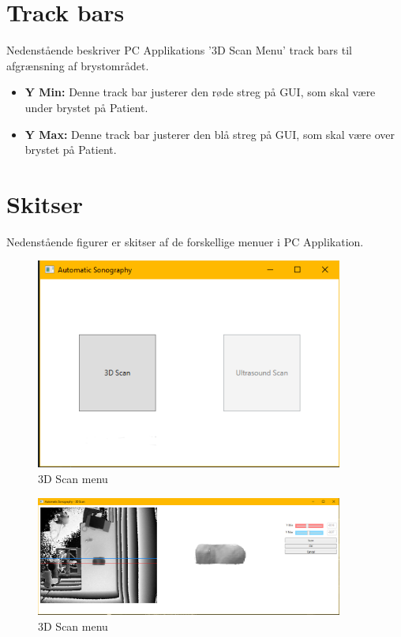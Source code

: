 \section{Track bars}
Nedenstående beskriver PC Applikations '3D Scan Menu' track bars til afgrænsning af brystområdet.  
\begin{itemize}
\item \textbf{Y Min:} Denne track bar justerer den røde streg på GUI, som skal være under brystet på Patient. 
\item \textbf{Y Max:} Denne track bar justerer den blå streg på GUI, som skal være over brystet på Patient. 
\end{itemize}

\section{Skitser}
Nedenstående figurer er skitser af de forskellige menuer i PC Applikation. 

\begin{figure} [h]
    \centering
    \includegraphics[width=0.9\textwidth]{figurer/d/GUIskitse/main_menu}
    \caption{3D Scan menu}
    \label{3Dscan}
\end{figure}

\begin{figure} [h]
    \centering
    \includegraphics[width=0.9\textwidth]{figurer/d/GUIskitse/3d_scan}
    \caption{3D Scan menu}
    \label{3Dscan}
\end{figure}

